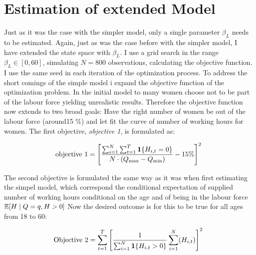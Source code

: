 \section{Estimation of extended Model}

Just as it was the case with the simpler model, only a single parameter $\beta_L$ needs to be estimated. Again, just as was the case before with the simpler model, I have extended the state space with $\beta_L$. I use a grid search in the range $\beta_L \in [0, 60]$, simulating $N=800$ observations, calculating the objective function. I use the same seed in each iteration of the optimization process. To address the short comings of the simple model i expand the objective function of the optimization problem. In the initial model to many women choose not to be part of the labour force yielding unrealistic results. Therefore the objective function now extends to two broad goals: Have the right number of women be out of the labour force (around15 \%) and let fit the curve of number of working hours for women. The first objective, \textit{objective 1}, is formulated as: 

\begin{equation}
    \text{objective 1} = \left[\frac{\sum_{i=1}^{N} \sum_{t=1}^T \mathbf{1}\{H_{i,t} = 0\}}{ N \cdot (Q_{\max} - Q_{\min} )} - 15\% \right]^2
\end{equation}

The second objective is formulated the same way as it was when first estimating the simpel model, which correspond the conditional expectation of supplied number of working hours conditional on the age and of being in the labour force $ \mathbb{E}[H \mid Q=q, H>0]$ Now the desired outcome is for this to be true for all ages from 18 to 60:


\begin{equation}
    \text{Objective 2} = \sum_{t=1}^{T} \left[ \frac{1}{\sum_{i=1}^{N} \mathbf{1}\{H_{i,t} > 0\}}\sum_{i=1}^N (H_{i,t})\right]^2
\end{equation}

